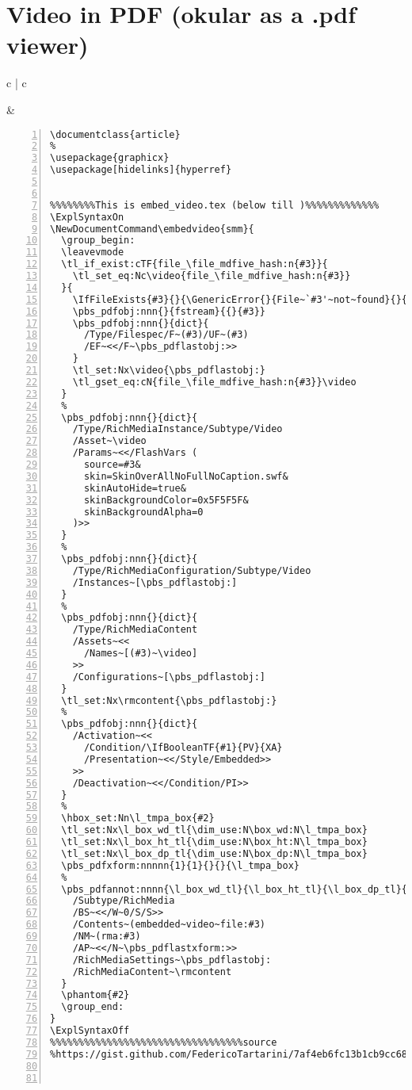 \section{Video in PDF (okular as a .pdf viewer)}
\begin{table}[h!]
\begin{tabular}{c | c}
\begin{minipage}[m]{0.4\textwidth}

\end{minipage}
&
\begin{minipage}[m]{0.55\textwidth}
\renewcommand\textminus{\mbox{-}}%

\begin{lstlisting}[numberstyle=\zebra{orange!15}{red!15},numbers=left,basicstyle=\tiny]
\documentclass{article}
%
\usepackage{graphicx}
\usepackage[hidelinks]{hyperref}


%%%%%%%%This is embed_video.tex (below till )%%%%%%%%%%%%% 
\ExplSyntaxOn
\NewDocumentCommand\embedvideo{smm}{
  \group_begin:
  \leavevmode
  \tl_if_exist:cTF{file_\file_mdfive_hash:n{#3}}{
    \tl_set_eq:Nc\video{file_\file_mdfive_hash:n{#3}}
  }{
    \IfFileExists{#3}{}{\GenericError{}{File~`#3'~not~found}{}{}}
    \pbs_pdfobj:nnn{}{fstream}{{}{#3}}
    \pbs_pdfobj:nnn{}{dict}{
      /Type/Filespec/F~(#3)/UF~(#3)
      /EF~<</F~\pbs_pdflastobj:>>
    }
    \tl_set:Nx\video{\pbs_pdflastobj:}
    \tl_gset_eq:cN{file_\file_mdfive_hash:n{#3}}\video
  }
  %
  \pbs_pdfobj:nnn{}{dict}{
    /Type/RichMediaInstance/Subtype/Video
    /Asset~\video
    /Params~<</FlashVars (
      source=#3&
      skin=SkinOverAllNoFullNoCaption.swf&
      skinAutoHide=true&
      skinBackgroundColor=0x5F5F5F&
      skinBackgroundAlpha=0
    )>>
  }
  %
  \pbs_pdfobj:nnn{}{dict}{
    /Type/RichMediaConfiguration/Subtype/Video
    /Instances~[\pbs_pdflastobj:]
  }
  %
  \pbs_pdfobj:nnn{}{dict}{
    /Type/RichMediaContent
    /Assets~<<
      /Names~[(#3)~\video]
    >>
    /Configurations~[\pbs_pdflastobj:]
  }
  \tl_set:Nx\rmcontent{\pbs_pdflastobj:}
  %
  \pbs_pdfobj:nnn{}{dict}{
    /Activation~<<
      /Condition/\IfBooleanTF{#1}{PV}{XA}
      /Presentation~<</Style/Embedded>>
    >>
    /Deactivation~<</Condition/PI>>
  }
  %
  \hbox_set:Nn\l_tmpa_box{#2}
  \tl_set:Nx\l_box_wd_tl{\dim_use:N\box_wd:N\l_tmpa_box}
  \tl_set:Nx\l_box_ht_tl{\dim_use:N\box_ht:N\l_tmpa_box}
  \tl_set:Nx\l_box_dp_tl{\dim_use:N\box_dp:N\l_tmpa_box}
  \pbs_pdfxform:nnnnn{1}{1}{}{}{\l_tmpa_box}
  %
  \pbs_pdfannot:nnnn{\l_box_wd_tl}{\l_box_ht_tl}{\l_box_dp_tl}{
    /Subtype/RichMedia
    /BS~<</W~0/S/S>>
    /Contents~(embedded~video~file:#3)
    /NM~(rma:#3)
    /AP~<</N~\pbs_pdflastxform:>>
    /RichMediaSettings~\pbs_pdflastobj:
    /RichMediaContent~\rmcontent
  }
  \phantom{#2}
  \group_end:
}
\ExplSyntaxOff
%%%%%%%%%%%%%%%%%%%%%%%%%%%%%%%%%%source
%https://gist.github.com/FedericoTartarini/7af4eb6fc13b1cb9cc68b7e8ea823d50



\end{lstlisting}
\end{minipage}
\end{tabular}
\end{table}
